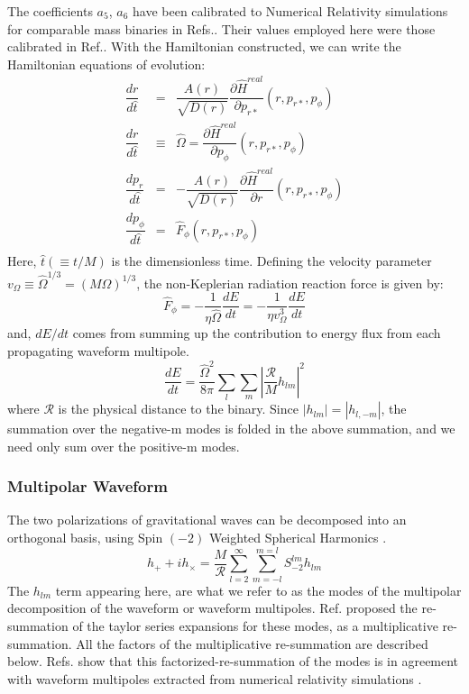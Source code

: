 \documentclass[aps,
prd,
amsmath,
amssymb,
twocolumn,
floatfix,
groupedaddress]{revtex4-1}
\newcommand{\Sum}{\displaystyle\sum\limits}
\begin{document}
The coefficients $a_5$, $a_6$ have been calibrated to Numerical Relativity simulations for comparable mass binaries in Refs.\citep{EOBNRdevel01,EOBNRdevel02,EOBNRdevel03,EOBNRdevel04}. Their values employed here were those calibrated in Ref.\citep{BuonannoEOBv2Main}.
With the Hamiltonian constructed, we can write the Hamiltonian equations of evolution:
\begin{eqnarray}
\dfrac{dr}{d\hat{t}} &=& \dfrac{A(r)}{\sqrt{D(r)}}\dfrac{\partial \hat{H}^{real}}{\partial p_{r*}} (r, p_{r*}, p_{\phi})\\
\dfrac{dr}{d\hat{t}} &\equiv & \hat{\Omega} = \dfrac{\partial \hat{H}^{real}}{\partial p_{\phi}} (r, p_{r*}, p_{\phi}) \\ 
\dfrac{dp_r}{d\hat{t}} &=& -\dfrac{A(r)}{\sqrt{D(r)}} \dfrac{\partial \hat{H}^{real}}{\partial r} (r, p_{r*}, p_{\phi})\\
\dfrac{dp_{\phi}}{d\hat{t}} &=& \hat{F}_{\phi}(r, p_{r*}, p_{\phi})\\
\end{eqnarray}
Here, $\hat{t}(\equiv t/M)$ is the dimensionless time. Defining the velocity parameter $v_{\Omega}\equiv \hat{\Omega}^{1/3} = (M\Omega)^{1/3}$, the non-Keplerian radiation reaction force is given by:
\begin{equation}
\hat{F}_{\phi} = -\dfrac{1}{\eta \hat{\Omega}} \dfrac{dE}{dt} = -\dfrac{1}{\eta v_{\Omega}^3} \dfrac{dE}{dt}
\end{equation}
and, $dE/dt$ comes from summing up the contribution to energy flux from each propagating waveform multipole.
\begin{equation}
\frac{dE}{dt} = \frac{\hat{\Omega}^2}{8\pi} \Sum_{l}\Sum_{m} \left|\frac{\mathcal{R}}{M} h_{lm}\right|^2
\end{equation}
where $\mathcal{R}$ is the physical distance to the binary. Since $|h_{lm}|=|h_{l,-m}|$, the summation over the negative-m modes is folded in the above summation, and we need only sum over the positive-m modes.

\subsubsection{Multipolar Waveform}\label{sec:level3:Waveform:EOB:MultipolarWaveform}

The two polarizations of gravitational waves can be decomposed into an orthogonal basis, using Spin $(-2)$ Weighted Spherical Harmonics \citep{DataFormatNR}.
\begin{equation}
h_+ + ih_{\times} = \dfrac{M}{\mathcal{R}} \Sum^{\infty}_{l=2} \Sum^{m=l}_{m = -l} S^{lm}_{-2} h_{lm}
\end{equation}
The $h_{lm}$ term appearing here, are what we refer to as the modes of the multipolar decomposition of the waveform or waveform multipoles. Ref.\citep{DamourFluxhlm01} proposed the re-summation of the taylor series expansions for these modes, as a multiplicative re-summation. All the factors of the multiplicative re-summation are described below. Refs.\citep{EOBNRdevel01,EOBNRdevel02} show that this factorized-re-summation of the modes is in agreement with waveform multipoles extracted from numerical relativity simulations \citep{EOBNR01}. 
 
\end{document}
